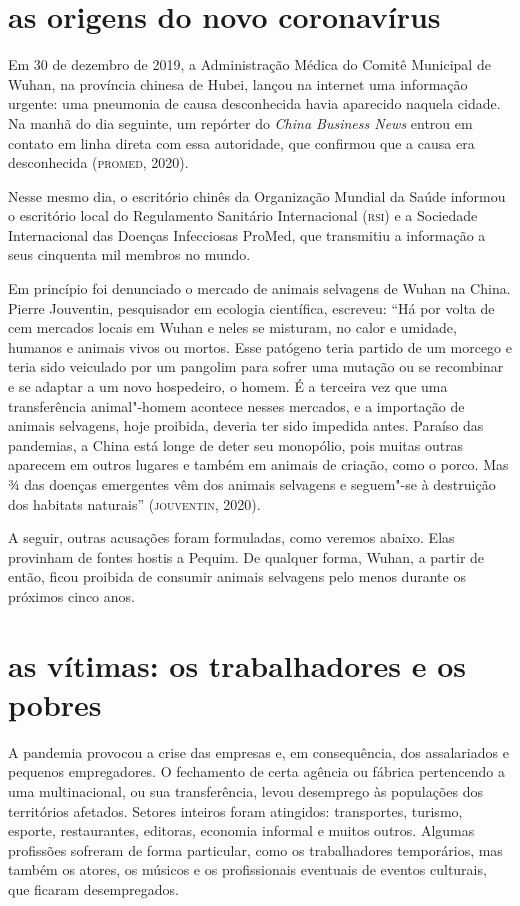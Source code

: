 \section{as origens do novo coronavírus}

Em 30 de dezembro de 2019, a Administração Médica do Comitê Municipal de
Wuhan, na província chinesa de Hubei, lançou na internet uma informação
urgente: uma pneumonia de causa desconhecida havia aparecido naquela
cidade. Na manhã do dia seguinte, um repórter do \emph{China Business
News} entrou em contato em linha direta com essa autoridade, que
confirmou que a causa era desconhecida (\textsc{promed}, 2020).

Nesse mesmo dia, o escritório chinês da Organização Mundial da Saúde
informou o escritório local do Regulamento Sanitário Internacional (\textsc{rsi})
e a Sociedade Internacional das Doenças Infecciosas ProMed, que
transmitiu a informação a seus cinquenta mil membros no mundo.

Em princípio foi denunciado o mercado de animais selvagens de Wuhan na
China. Pierre Jouventin, pesquisador em ecologia científica, escreveu:
``Há por volta de cem mercados locais em Wuhan e neles se misturam, no
calor e umidade, humanos e animais vivos ou mortos. Esse patógeno teria
partido de um morcego e teria sido veiculado por um pangolim para sofrer
uma mutação ou se recombinar e se adaptar a um novo hospedeiro, o homem.
É a terceira vez que uma transferência animal"-homem acontece nesses
mercados, e a importação de animais selvagens, hoje proibida, deveria
ter sido impedida antes. Paraíso das pandemias, a China está longe de
deter seu monopólio, pois muitas outras aparecem em outros lugares e
também em animais de criação, como o porco. Mas ¾ das doenças emergentes
vêm dos animais selvagens e seguem"-se à destruição dos habitats
naturais'' (\textsc{jouventin}, 2020).

A seguir, outras acusações foram formuladas, como veremos abaixo. Elas
provinham de fontes hostis a Pequim. De qualquer forma, Wuhan, a partir
de então, ficou proibida de consumir animais selvagens pelo menos
durante os próximos cinco anos.

\section{as vítimas: os trabalhadores e os pobres}

A pandemia provocou a crise das empresas e, em consequência, dos
assalariados e pequenos empregadores. O fechamento de certa agência ou
fábrica pertencendo a uma multinacional, ou sua transferência, levou
desemprego às populações dos territórios afetados. Setores inteiros
foram atingidos: transportes, turismo, esporte, restaurantes, editoras,
economia informal e muitos outros. Algumas profissões sofreram de forma
particular, como os trabalhadores temporários, mas também os atores, os
músicos e os profissionais eventuais de eventos culturais, que ficaram
desempregados.

